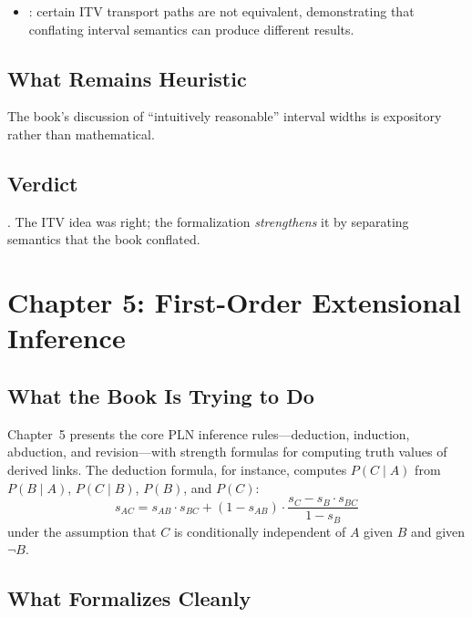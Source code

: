 \documentclass[11pt,openany]{report}
\begin{document}
\begin{itemize}
\item {}: certain ITV
  transport paths are not equivalent, demonstrating that conflating
  interval semantics can produce different results.
\end{itemize}

\section{What Remains Heuristic}

The book's discussion of ``intuitively reasonable'' interval widths
is expository rather than mathematical.

\section{Verdict}

\verdictCorrected{}.  The ITV idea was right; the formalization
\emph{strengthens} it by separating semantics that the book conflated.


\chapter{Chapter 5: First-Order Extensional Inference}
\label{ch:review-ch5}

\section{What the Book Is Trying to Do}

Chapter~5 presents the core PLN inference rules---deduction, induction,
abduction, and revision---with strength formulas for computing truth values
of derived links.  The deduction formula, for instance, computes
$P(C \mid A)$ from $P(B \mid A)$, $P(C \mid B)$, $P(B)$, and $P(C)$:
\[
  s_{AC} = s_{AB} \cdot s_{BC} + (1 - s_{AB}) \cdot
  \frac{s_C - s_B \cdot s_{BC}}{1 - s_B}
\]
under the assumption that $C$ is conditionally independent of $A$
given $B$ and given $\lnot B$.

\section{What Formalizes Cleanly}
\end{document}
